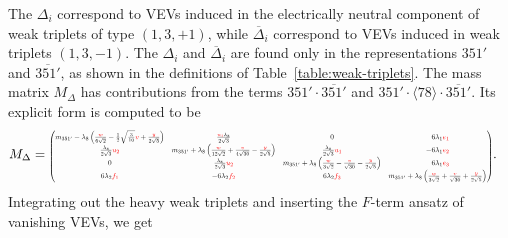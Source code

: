 \documentclass[a4paper,12pt]{article}
\def\RED{\textcolor{red}}
\begin{document}
The $\Delta_i$ correspond to VEVs induced in the electrically neutral component of weak triplets of type $(1,3,+1)$, while $\overline{\Delta}_i$ correspond to VEVs induced in weak triplets $(1,3,-1)$. The $\Delta_i$ and $\overline{\Delta}_i$ are found only in the representations $351'$ and $\overline{351'}$, as shown in the definitions of Table~\ref{table:weak-triplets}. The mass matrix $M_{\Delta}$ has contributions from the terms $351'\cdot\overline{351'}$ and $351'\cdot\langle 78\rangle\cdot\overline{351'}$. Its explicit form is computed to be
    \begin{align}
    M_\Delta&=\scalebox{0.55}{$
    \begin{pmatrix}
     m_{351'}-\lambda _8 \left(\frac{\RED{w}}{6 \sqrt{2}}-\frac{1}{2} \sqrt{\frac{3}{10}} \RED{v}+\frac{\RED{y}}{2 \sqrt{5}}\right)
   & \frac{\RED{u_1} \lambda _8}{2 \sqrt{3}} & 0 & \phantom{-}6 \lambda _1 \RED{e_1} \\
    \frac{\lambda _8}{2 \sqrt{3}}\RED{u_2} & m_{351'}+\lambda_8 \left(\frac{\RED{w}}{12 \sqrt{2}}+\frac{\RED{v}}{4 \sqrt{30}}-\frac{\RED{y}}{2 \sqrt{5}}\right)& \frac{\lambda_8}{2 \sqrt{3}}\RED{u_1} & -6 \lambda _1 \RED{e_2}
   \\
    0 & \frac{\lambda _8}{2 \sqrt{3}}\RED{u_2} & m_{351'}+ \lambda _8\left(\frac{\RED{w}}{3 \sqrt{2}}-\frac{\RED{v}}{\sqrt{30}}-\frac{\RED{y}}{2 \sqrt{5}}\right) & \phantom{-}6 \lambda _1\RED{e_3} \\
    6 \lambda _2\RED{f_1} & -6 \lambda _2\RED{f_2} & 6 \lambda _2 \RED{f_3} & m_{351'}+ \lambda _8 \left(\frac{\RED{w}}{3 \sqrt{2}}+\frac{\RED{v}}{\sqrt{30}}+\frac{\RED{y}}{2 \sqrt{5}}\right)
    \end{pmatrix}
    $}.
    \end{align}
Integrating out the heavy weak triplets and inserting the $F$-term ansatz of vanishing VEVs, we get
\end{document}
